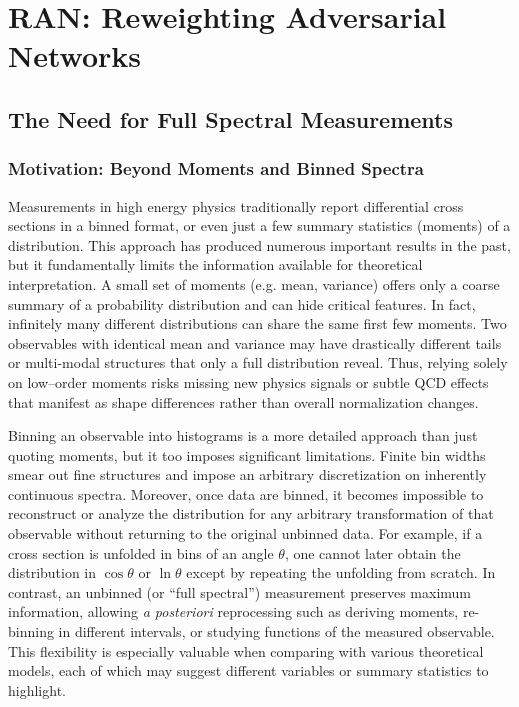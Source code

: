 \chapter{RAN: Reweighting Adversarial Networks}
\label{chap:ran}
\section{The Need for Full Spectral Measurements}
    \label{sec:need-for-density-unfolding}
    \subsection{Motivation: Beyond Moments and Binned Spectra}
    Measurements in high energy physics traditionally report differential cross sections in a binned format, or even just a few summary statistics (moments) of a distribution. 
    This approach has produced numerous important results in the past, but it fundamentally limits the information available for theoretical interpretation.
    A small set of moments (e.g. mean, variance) offers only a coarse summary of a probability distribution and can hide critical features.
    In fact, infinitely many different distributions can share the same first few moments.
    Two observables with identical mean and variance may have drastically different tails or multi-modal structures that only a full distribution reveal.
    Thus, relying solely on low--order moments risks missing new physics signals or subtle QCD effects that manifest as shape differences rather than overall normalization changes.

    Binning an observable into histograms is a more detailed approach than just quoting moments, but it too imposes significant limitations.
    Finite bin widths smear out fine structures and impose an arbitrary discretization on inherently continuous spectra.
    Moreover, once data are binned, it becomes impossible to reconstruct or analyze the distribution for any arbitrary transformation of that observable without returning to the original unbinned data.
    For example, if a cross section is unfolded in bins of an angle $\theta$, one cannot later obtain the distribution in $\cos\theta$ or $\ln\theta$ except by repeating the unfolding from scratch.
    In contrast, an unbinned (or “full spectral”) measurement preserves maximum information, allowing \textit{a posteriori} reprocessing such as deriving moments, re-binning in different intervals, or studying functions of the measured observable.
    This flexibility is especially valuable when comparing with various theoretical models, each of which may suggest different variables or summary statistics to highlight.

